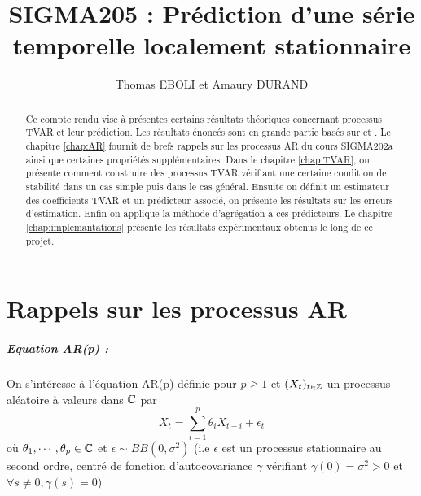\documentclass{report}
\title{SIGMA205 : Prédiction d'une série temporelle localement
stationnaire}
\author{Thomas EBOLI et Amaury DURAND}
\begin{document}
\maketitle
\begin{abstract}
Ce compte rendu vise à présentes certains résultats théoriques concernant processus TVAR et leur prédiction. Les résultats énoncés sont en grande partie basés sur \cite{giraud-roueff-sanchez-aos2015} et \citep{moulines-priouret-roueff-2005}. Le chapitre \ref{chap:AR} fournit de brefs rappels sur les processus AR du cours SIGMA202a ainsi que certaines propriétés supplémentaires. Dans le chapitre \ref{chap:TVAR}, on présente comment construire des processus TVAR vérifiant une certaine condition de stabilité dans un cas simple puis dans le cas général. Ensuite on définit un estimateur des coefficients TVAR et un prédicteur associé, on présente les résultats sur les erreurs d'estimation. Enfin on applique la méthode d'agrégation à ces prédicteurs. Le chapitre \ref{chap:implemantations} présente les résultats expérimentaux obtenus le long de ce projet.
\end{abstract}
\tableofcontents
\printnomenclature
\chapter{Rappels sur les processus AR}\label{chap:AR}
\paragraph{Equation AR(p) :} 
On s'intéresse à l'équation AR(p) définie pour $p\geq 1$ et $(X_t)_{t\in \mathbb{Z}}$ un processus aléatoire à valeurs dans $\mathbb{C}$ par 
\begin{equation}\label{eq:AR}
X_t = \sum_{i=1}^p \theta_i X_{t-i} + \epsilon_t
\tag{AR}
\end{equation}
où $\theta_1,\cdots,\theta_p \in \mathbb{C}$ et $\epsilon \sim BB(0,\sigma^2)$ (i.e $\epsilon$ est un processus stationnaire au second ordre, centré de fonction d'autocovariance $\gamma$ vérifiant $\gamma(0)=\sigma^2 > 0$ et $\forall s\neq 0, \gamma(s)=0$)
\end{document}
